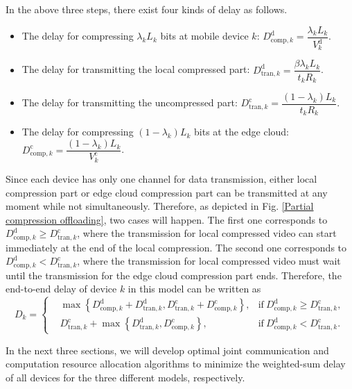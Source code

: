 \documentclass[journal,draftcls,onecolumn,12pt,twoside]{IEEEtran}
\begin{document}
In the above three steps, there exist four kinds of delay as follows.
\begin{itemize}
	\item The delay for compressing $\lambda_k L_k$ bits at mobile device $k$: $D_{\text{comp},k}^{\text{d}} = \dfrac{\lambda_k L_k}{V_k^{\text{d}}}$.
	\item The delay for transmitting the local compressed part: $D_{\text{tran},k}^{\text{d}} = \dfrac{\beta \lambda_k L_k}{t_k R_k}$.
	\item The delay for transmitting the uncompressed part: $D_{\text{tran},k}^{\text{c}} = \dfrac{(1-\lambda_k)L_k}{t_k R_k}$.
	\item The delay for compressing $(1-\lambda_k)L_k$ bits at the edge cloud: $D_{\text{comp},k}^{\text{c}} = \dfrac{(1-\lambda_k)L_k}{V_k^{\text{c}}}$.
\end{itemize}

Since each device has only one channel for data transmission, either local compression part or edge cloud compression part can be transmitted at any moment while not simultaneously. Therefore, as depicted in Fig. \ref{Partial compression offloading}, two cases will happen. The first one corresponds to $D_{\text{comp},k}^{\text{d}} \ge D_{\text{tran},k}^{\text{c}}$, where the transmission for local compressed video can start immediately at the end of the local compression. The second one corresponds to $D_{\text{comp},k}^{\text{d}} < D_{\text{tran},k}^{\text{c}}$, where the transmission for local compressed video must wait until the transmission for the edge cloud compression part ends. Therefore, the end-to-end delay of device $k$ in this model can be written as
\begin{equation}
	D_k = \left \{
    \begin{aligned}
        &\max \left \{ D_{\text{comp},k}^{\text{d}} + D_{\text{tran},k}^{\text{d}},D_{\text{tran},k}^{\text{c}} + D_{\text{comp},k}^{\text{c}}
              \right\}, &\text{if}~D_{\text{comp},k}^{\text{d}} \ge D_{\text{tran},k}^{\text{c}},\\
        &D_{\text{tran},k}^{\text{c}} + \max \left \{ D_{\text{tran},k}^{\text{d}},D_{\text{comp},k}^{\text{c}} \right \}, &\text{if}~D_{\text{comp},k}^{\text{d}} < D_{\text{tran},k}^{\text{c}}.\label{5}
	\end{aligned} \right.
\end{equation}

In the next three sections, we will develop optimal joint communication and computation resource allocation algorithms to minimize the weighted-sum delay of all devices for the three different models, respectively.
\end{document}
